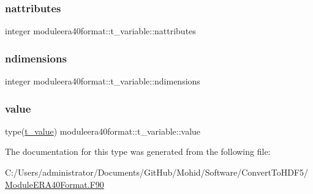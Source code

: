 \subsubsection{\texorpdfstring{nattributes}{nattributes}}
{\footnotesize\ttfamily integer moduleera40format\+::t\+\_\+variable\+::nattributes\hspace{0.3cm}{\ttfamily [private]}}

\mbox{\label{structmoduleera40format_1_1t__variable_ae017b9f4d719564753b38d69d9eb33db}} 
\subsubsection{\texorpdfstring{ndimensions}{ndimensions}}
{\footnotesize\ttfamily integer moduleera40format\+::t\+\_\+variable\+::ndimensions\hspace{0.3cm}{\ttfamily [private]}}

\mbox{\label{structmoduleera40format_1_1t__variable_a9f5250755984d884c7abec1b944ba6f2}} 
\subsubsection{\texorpdfstring{value}{value}}
{\footnotesize\ttfamily type(\mbox{\hyperlink{structmoduleera40format_1_1t__value}{t\+\_\+value}}) moduleera40format\+::t\+\_\+variable\+::value\hspace{0.3cm}{\ttfamily [private]}}



The documentation for this type was generated from the following file\+:\begin{DoxyCompactItemize}
\item 
C\+:/\+Users/administrator/\+Documents/\+Git\+Hub/\+Mohid/\+Software/\+Convert\+To\+H\+D\+F5/\mbox{\hyperlink{_module_e_r_a40_format_8_f90}{Module\+E\+R\+A40\+Format.\+F90}}\end{DoxyCompactItemize}
